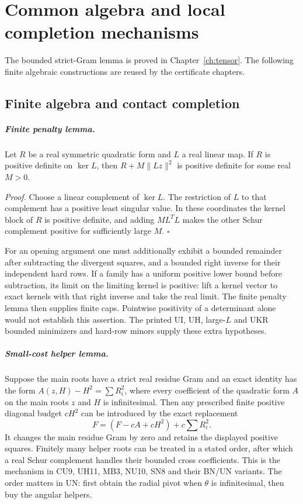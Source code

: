 \chapter{Common algebra and local completion mechanisms}
\label{ch:mechanisms}
The bounded strict-Gram lemma is proved in Chapter~\ref{ch:tensor}. The following finite algebraic constructions are reused by the certificate chapters.
\section{Finite algebra and contact completion}
\paragraph{Finite penalty lemma.}
Let $R$ be a real symmetric quadratic form and $L$ a real linear
map.  If $R$ is positive definite on $\ker L$, then
$R+M\|Lz\|^2$ is positive definite for some real $M>0$.

\emph{Proof.}
Choose a linear complement of $\ker L$.  The restriction of $L$
to that complement has a positive least singular value.  In these
coordinates the kernel block of $R$ is positive definite, and
adding $M L^TL$ makes the other Schur complement positive for
sufficiently large $M$. \hfill$\square$

For an opening argument one must additionally exhibit a bounded
remainder after subtracting the divergent squares, and a bounded
right inverse for their independent hard rows.  If a family has a
uniform positive lower bound before subtraction, its limit on the
limiting kernel is positive: lift a kernel vector to exact kernels
with that right inverse and take the real limit.  The finite penalty
lemma then supplies finite caps.  Pointwise positivity of a
determinant alone would not establish this assertion.  The printed
UI, UH, large-$L$ and UKR bounded minimizers and hard-row minors
supply these extra hypotheses.

\paragraph{Small-cost helper lemma.}
Suppose the main roots have a strict real residue Gram and an exact
identity has the form $A(z,H)-H^2=\sum R_i^2$, where every
coefficient of the quadratic form $A$ on the main roots $z$ and
$H$ is infinitesimal.  Then any prescribed finite positive diagonal
budget $cH^2$ can be introduced by the exact replacement
\[
          F=(F-cA+cH^2)+c\sum R_i^2.
\]
It changes the main residue Gram by zero and retains the displayed
positive squares.  Finitely
many helper roots can be treated in a stated order, after which a
real Schur complement handles their bounded cross coefficients.
This is the mechanism in CU9, UH11, MB3, NU10, SN8 and their
BN/UN variants.  The order matters in UN: first obtain the radial
pivot when $\theta$ is infinitesimal, then buy the angular helpers.

